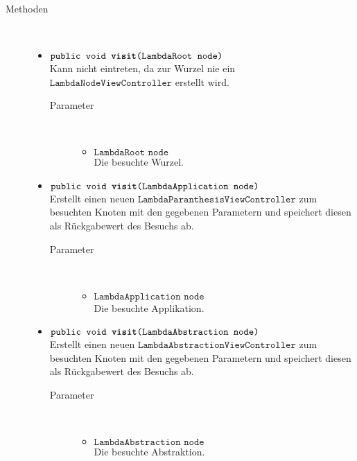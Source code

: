 \begin{description}
\item[Methoden] \hfill \\
	\vspace{-.8cm}
	\begin{itemize}
		\item $\texttt{public void \textbf{visit}(LambdaRoot node)}$ \\ Kann nicht eintreten, da zur Wurzel nie ein $\texttt{LambdaNodeViewController}$ erstellt wird.
		\begin{description}
			\item[Parameter] \hfill \\
			\vspace{-.8cm}
			\begin{itemize}
				\item $\texttt{LambdaRoot node}$ \\ Die besuchte Wurzel.
			\end{itemize}
		\end{description}
				
		\item $\texttt{public void \textbf{visit}(LambdaApplication node)}$ \\ Erstellt einen neuen $\texttt{LambdaParanthesisViewController}$ zum besuchten Knoten mit den gegebenen Parametern und speichert diesen als Rückgabewert des Besuchs ab.
		\begin{description}
			\item[Parameter] \hfill \\
			\vspace{-.8cm}
			\begin{itemize}
				\item $\texttt{LambdaApplication node}$ \\ Die besuchte Applikation.
			\end{itemize}
		\end{description}
		
		\item $\texttt{public void \textbf{visit}(LambdaAbstraction node)}$ \\ Erstellt einen neuen $\texttt{LambdaAbstractionViewController}$ zum besuchten Knoten mit den gegebenen Parametern und speichert diesen als Rückgabewert des Besuchs ab.
		\begin{description}
			\item[Parameter] \hfill \\
			\vspace{-.8cm}
			\begin{itemize}
				\item $\texttt{LambdaAbstraction node}$ \\ Die besuchte Abstraktion.
			\end{itemize}
		\end{description}
		

\end{itemize}
\end{description}
